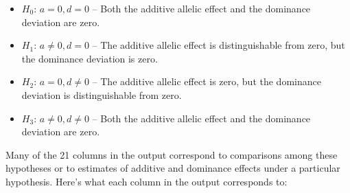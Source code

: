 \begin{itemize}

\item $H_0$: $a=0, d=0$ -- Both the additive allelic effect and the
  dominance deviation are zero.

\item $H_1$: $a \ne 0, d=0$ -- The additive allelic effect is
  distinguishable from zero, but the dominance deviation is zero.

\item $H_2$: $a=0, d \ne 0$ -- The additive allelic effect is zero,
  but the dominance deviation is distinguishable from zero. 

\item $H_3$: $a \ne 0, d \ne 0$ -- Both the additive allelic effect
  and the dominance deviation are zero.

\end{itemize}

\noindent Many of the 21 columns in the output correspond to
comparisons among these hypotheses or to estimates of additive and
dominance effects under a particular hypothesis. Here's what each
column in the output corresponds to:

